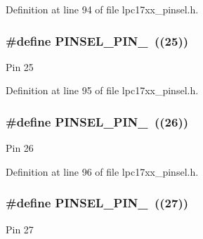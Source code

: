 Definition at line 94 of file lpc17xx\+\_\+pinsel.\+h.

\subsubsection[{\texorpdfstring{P\+I\+N\+S\+E\+L\+\_\+\+P\+I\+N\+\_\+25}{PINSEL_PIN_25}}]{\setlength{\rightskip}{0pt plus 5cm}\#define P\+I\+N\+S\+E\+L\+\_\+\+P\+I\+N\+\_~((25))}\hypertarget{group___p_i_n_s_e_l___public___macros_ga7c717ad27b00320f904d2b43044ba715}{}\label{group___p_i_n_s_e_l___public___macros_ga7c717ad27b00320f904d2b43044ba715}
Pin 25 

Definition at line 95 of file lpc17xx\+\_\+pinsel.\+h.

\subsubsection[{\texorpdfstring{P\+I\+N\+S\+E\+L\+\_\+\+P\+I\+N\+\_\+26}{PINSEL_PIN_26}}]{\setlength{\rightskip}{0pt plus 5cm}\#define P\+I\+N\+S\+E\+L\+\_\+\+P\+I\+N\+\_~((26))}\hypertarget{group___p_i_n_s_e_l___public___macros_ga34dc530d30abfe96758b94606849361f}{}\label{group___p_i_n_s_e_l___public___macros_ga34dc530d30abfe96758b94606849361f}
Pin 26 

Definition at line 96 of file lpc17xx\+\_\+pinsel.\+h.

\subsubsection[{\texorpdfstring{P\+I\+N\+S\+E\+L\+\_\+\+P\+I\+N\+\_\+27}{PINSEL_PIN_27}}]{\setlength{\rightskip}{0pt plus 5cm}\#define P\+I\+N\+S\+E\+L\+\_\+\+P\+I\+N\+\_~((27))}\hypertarget{group___p_i_n_s_e_l___public___macros_gaed7e80ef29cd5027ef7794d78861dc12}{}\label{group___p_i_n_s_e_l___public___macros_gaed7e80ef29cd5027ef7794d78861dc12}
Pin 27 

